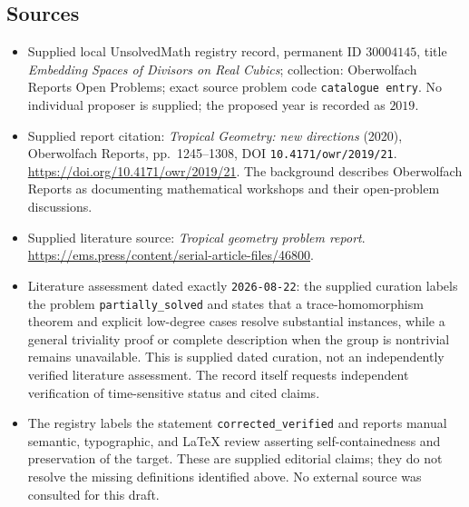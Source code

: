 \documentclass[11pt]{article}
\begin{document}
\subsection{Sources}
\begin{itemize}
\item Supplied local UnsolvedMath registry record, permanent ID \(30004145\), title \emph{Embedding Spaces of Divisors on Real Cubics}; collection: Oberwolfach Reports Open Problems; exact source problem code \texttt{catalogue entry}. No individual proposer is supplied; the proposed year is recorded as \(2019\).
\item Supplied report citation: \emph{Tropical Geometry: new directions} (2020), Oberwolfach Reports, pp.~1245--1308, DOI \texttt{10.4171/owr/2019/21}. \url{https://doi.org/10.4171/owr/2019/21}. The background describes Oberwolfach Reports as documenting mathematical workshops and their open-problem discussions.
\item Supplied literature source: \emph{Tropical geometry problem report}. \url{https://ems.press/content/serial-article-files/46800}.
\item Literature assessment dated exactly \texttt{2026-08-22}: the supplied curation labels the problem \texttt{partially\_solved} and states that a trace-homomorphism theorem and explicit low-degree cases resolve substantial instances, while a general triviality proof or complete description when the group is nontrivial remains unavailable. This is supplied dated curation, not an independently verified literature assessment. The record itself requests independent verification of time-sensitive status and cited claims.
\item The registry labels the statement \texttt{corrected\_verified} and reports manual semantic, typographic, and LaTeX review asserting self-containedness and preservation of the target. These are supplied editorial claims; they do not resolve the missing definitions identified above. No external source was consulted for this draft.
\end{itemize}
\end{document}
